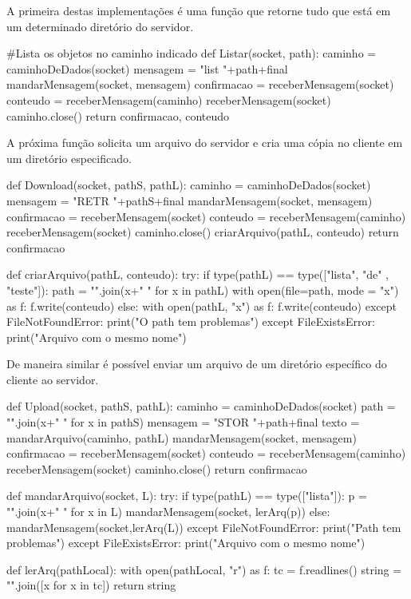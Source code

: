 \documentclass[11pt]{IEEEtran}
\begin{document}
A primeira destas implementações é uma função que retorne tudo que está em um determinado diretório do servidor.

\begin{python}
#Lista os objetos no caminho indicado
def Listar(socket, path):
 caminho = caminhoDeDados(socket)
 mensagem = "list "+path+final
 mandarMensagem(socket, mensagem)
 confirmacao = receberMensagem(socket)
 conteudo = receberMensagem(caminho)
 receberMensagem(socket)
 caminho.close()
 return confirmacao, conteudo
\end{python}

A próxima função solicita um arquivo do servidor e cria uma cópia no cliente em um diretório especificado.
\begin{python}
def Download(socket, pathS, pathL):
 caminho = caminhoDeDados(socket)
 mensagem = "RETR "+pathS+final
 mandarMensagem(socket, mensagem)
 confirmacao = receberMensagem(socket)
 conteudo = receberMensagem(caminho)
 receberMensagem(socket)
 caminho.close()
 criarArquivo(pathL, conteudo) 
 return confirmacao

def criarArquivo(pathL, conteudo):
 try:
  if type(pathL) == type(["lista", "de"
                           , "teste"]):
   path = "".join(x+" " for x in pathL)
   with open(file=path, mode = "x") 
                                 as f:
      f.write(conteudo)
  else:
   with open(pathL, "x") as f:
      f.write(conteudo)
 except FileNotFoundError:
    print("O path tem problemas")
 except FileExistsError:
    print("Arquivo com o mesmo nome")
\end{python}

De maneira similar é possível enviar um arquivo de um diretório específico do cliente ao servidor.
\begin{python}
def Upload(socket, pathS, pathL):
  caminho = caminhoDeDados(socket)
  path = "".join(x+" " for x in pathS)
  mensagem = "STOR "+path+final 
  texto = mandarArquivo(caminho, pathL)
  mandarMensagem(socket, mensagem)
  confirmacao = receberMensagem(socket)
  conteudo = receberMensagem(caminho)
  receberMensagem(socket)
  caminho.close()    
  return confirmacao

def mandarArquivo(socket, L):
 try:
   if type(pathL) == type(["lista"]):
    p = "".join(x+" " for x in L)
    mandarMensagem(socket, lerArq(p))
   else:
    mandarMensagem(socket,lerArq(L))
 except FileNotFoundError:
   print("Path tem problemas")
 except FileExistsError:
    print("Arquivo com o mesmo nome")

def lerArq(pathLocal):
  with open(pathLocal, "r") as f:
     tc = f.readlines()
     string = "".join([x for x in tc])
     return string
\end{python}
\end{document}

